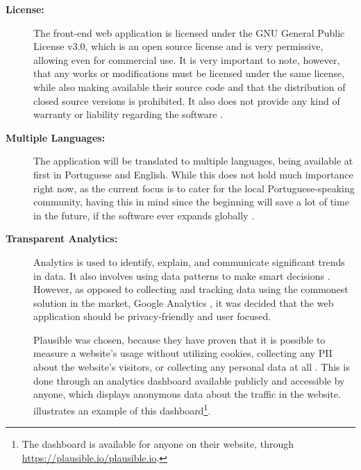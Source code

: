 \begin{description}
  \item[\textbf{License:}] The front-end web application is licensed under the GNU General Public License v3.0, which is an open source license and is very permissive, allowing even for commercial use. It is very important to note, however, that any works or modifications must be licensed under the same license, while also making available their source code and that the distribution of closed source versions is prohibited. It also does not provide any kind of warranty or liability regarding the software \cite{gnugpl3}.
  \item[\textbf{Multiple Languages:}] The application will be translated to multiple languages, being available at first in Portuguese and English. While this does not hold much importance right now, as the current focus is to cater for the local Portuguese-speaking community, having this in mind since the beginning will save a lot of time in the future, if the software ever expands globally \cite{reynolds_2020}.
  \item[\textbf{Transparent Analytics:}] Analytics is used to identify, explain, and communicate significant trends in data. It also involves using data patterns to make smart decisions \cite{Kohavi02emergingtrends}. However, as opposed to collecting and tracking data using the commonest solution in the market, Google Analytics \cite{w3techs_2019}, it was decided that the web application should be privacy-friendly and user focused.

    Plausible was chosen, because they have proven that it is possible to measure a website's usage without utilizing cookies, collecting any \ac{PII} about the website's visitors, or collecting any personal data at all \cite{plausible_2022}. This is done through an analytics dashboard available publicly and accessible by anyone, which displays anonymous data about the traffic in the website.  illustrates an example of this dashboard\footnote{The dashboard is available for anyone on their website, through \url{https://plausible.io/plausible.io}.}.


\end{description}
